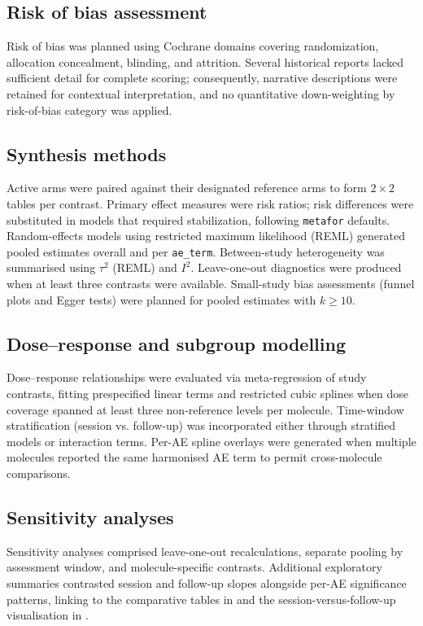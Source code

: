 \documentclass[11pt,a4paper]{article}
\begin{document}
\subsection{Risk of bias assessment}
Risk of bias was planned using Cochrane domains covering randomization, allocation concealment, blinding, and attrition. Several historical reports lacked sufficient detail for complete scoring; consequently, narrative descriptions were retained for contextual interpretation, and no quantitative down-weighting by risk-of-bias category was applied.

\subsection{Synthesis methods}
Active arms were paired against their designated reference arms to form $2\times2$ tables per contrast. Primary effect measures were risk ratios; risk differences were substituted in models that required stabilization, following \texttt{metafor} defaults. Random-effects models using restricted maximum likelihood (REML) generated pooled estimates overall and per \texttt{ae\_term}. Between-study heterogeneity was summarised using $\tau^2$ (REML) and $I^2$. Leave-one-out diagnostics were produced when at least three contrasts were available. Small-study bias assessments (funnel plots and Egger tests) were planned for pooled estimates with $k\geq10$.

\subsection{Dose--response and subgroup modelling}
Dose--response relationships were evaluated via meta-regression of study contrasts, fitting prespecified linear terms and restricted cubic splines when dose coverage spanned at least three non-reference levels per molecule. Time-window stratification (session vs. follow-up) was incorporated either through stratified models or interaction terms. Per-AE spline overlays were generated when multiple molecules reported the same harmonised AE term to permit cross-molecule comparisons.

\subsection{Sensitivity analyses}
Sensitivity analyses comprised leave-one-out recalculations, separate pooling by assessment window, and molecule-specific contrasts. Additional exploratory summaries contrasted session and follow-up slopes alongside per-AE significance patterns, linking to the comparative tables in  and the session-versus-follow-up visualisation in .
\end{document}
